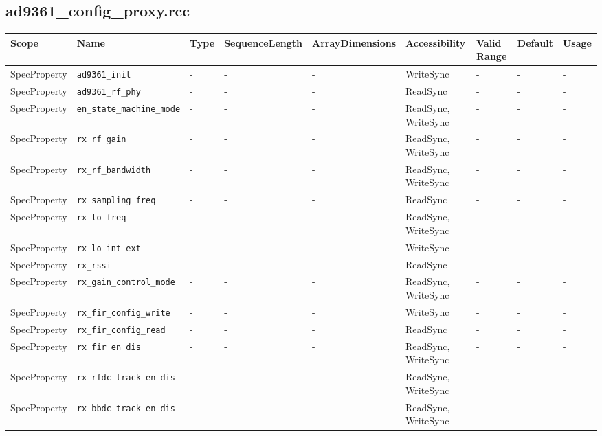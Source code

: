 \documentclass{article}
\def\comp{ad9361\_config\_proxy}
\begin{document}
\begin{landscape}
	\subsection*{\comp.rcc}
	\begin{scriptsize}
		\begin{longtable}{|p{2cm}|p{4cm}|p{1cm}|p{2cm}|p{2cm}|p{2cm}|p{2cm}|p{1cm}|p{4.58cm}|}
			\hline
			\rowcolor{blue}
			Scope        & Name                 & Type & SequenceLength & ArrayDimensions & Accessibility & Valid Range        & Default & Usage                                                                                                                  \\
			\hline
			SpecProperty & \verb+ad9361_init+ & - & - & - & WriteSync & - & - & - \\
			\hline
			SpecProperty & \verb+ad9361_rf_phy+ & - & - & - & ReadSync & - & - & - \\
			\hline
			SpecProperty & \verb+en_state_machine_mode+ & - & - & - & ReadSync, WriteSync & - & - & - \\
			\hline
			SpecProperty & \verb+rx_rf_gain+ & - & - & - & ReadSync, WriteSync & - & - & - \\
			\hline
			SpecProperty & \verb+rx_rf_bandwidth+ & - & - & - & ReadSync, WriteSync & - & - & - \\
			\hline
			SpecProperty & \verb+rx_sampling_freq+ & - & - & - & ReadSync & - & - & - \\
			\hline
			SpecProperty & \verb+rx_lo_freq+ & - & - & - & ReadSync, WriteSync & - & - & - \\
			\hline
			SpecProperty & \verb+rx_lo_int_ext+ & - & - & - & WriteSync & - & - & - \\
			\hline
			SpecProperty & \verb+rx_rssi+ & - & - & - & ReadSync  & - & - & - \\
			\hline
			SpecProperty & \verb+rx_gain_control_mode+ & - & - & - & ReadSync, WriteSync & - & - & - \\
			\hline
			SpecProperty & \verb+rx_fir_config_write+ & - & - & - & WriteSync & - & - & - \\
			\hline
			SpecProperty & \verb+rx_fir_config_read+ & - & - & - & ReadSync  & - & - & - \\
			\hline
			SpecProperty & \verb+rx_fir_en_dis+ & - & - & - & ReadSync, WriteSync & - & - & - \\
			\hline
			SpecProperty & \verb+rx_rfdc_track_en_dis+ & - & - & - & ReadSync, WriteSync & - & - & - \\
			\hline
			SpecProperty & \verb+rx_bbdc_track_en_dis+ & - & - & - & ReadSync, WriteSync & - & - & - \\

\end{longtable}
\end{scriptsize}
\end{landscape}
\end{document}
